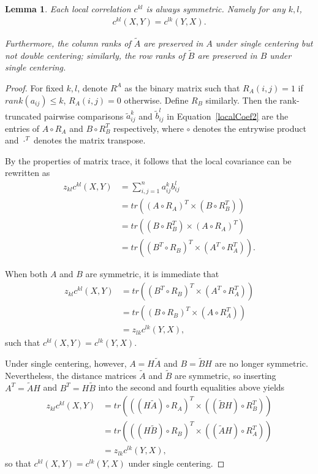 \documentclass[11pt]{article}
\providecommand{\mt}[1]{\widetilde{#1}}
\newcommand{\G}{c}
\newtheorem{appLem}{Lemma}
\begin{document}
\begin{appLem}
Each local correlation $\G^{kl}$ is always symmetric. Namely for any $k,l$, 
\begin{align*}
\G^{kl}(X,Y)=\G^{lk}(Y,X).
\end{align*}

Furthermore, the column ranks of $\tilde{A}$ are preserved in $A$ under single centering but not double centering; similarly, the row ranks of $\tilde{B}$ are preserved in $B$ under single centering.
\end{appLem}
\begin{proof}
For fixed $k,l$, denote $R^{A}$ as the binary matrix such that $R_{A}(i,j)=1$ if $rank(a_{ij}) \leq k$, $R_{A}(i,j)=0$ otherwise. Define $R_{B}$ similarly. Then the rank-truncated pairwise comparisons $\mt{a}_{ij}^k$ and $\mt{b}_{ij}^l$ in Equation~\ref{localCoef2} are the entries of $A \circ R_{A}$ and $B \circ R_{B}^{T}$ respectively, where $\circ$ denotes the entrywise product and $\cdot^{T}$ denotes the matrix transpose.

By the properties of matrix trace, it follows that the local covariance can be rewritten as
\begin{align*}
z_{kl} \G^{kl}(X,Y) &= \textstyle \sum_{i,j=1}^n a_{ij}^k b_{ij}^l \\
 &= tr((A \circ R_{A})^{T} \times (B \circ R_{B}^{T})) \\
 &= tr((B \circ R_{B}^{T}) \times (A \circ R_{A})^{T}) \\
 &= tr((B^{T} \circ R_{B})^{T} \times (A^{T} \circ R_{A}^{T})).
\end{align*}

When both $A$ and $B$ are symmetric, it is immediate that
\begin{align*}
z_{kl} \G^{kl}(X,Y) &= tr((B^{T} \circ R_{B})^{T} \times (A^{T} \circ R_{A}^{T})) \\
 &= tr((B \circ R_{B})^{T} \times (A \circ R_{A}^{T})) \\
 &= z_{lk} \G^{lk}(Y,X),
\end{align*}
such that $\G^{kl}(X,Y)=\G^{lk}(Y,X)$.

Under single centering, however, $A=H \tilde{A}$ and $B=\tilde{B}H$ are no longer symmetric. Nevertheless, the distance matrices $\tilde{A}$ and $\tilde{B}$ are symmetric, so inserting $A^{T}=\tilde{A}H$ and $B^{T}=H\tilde{B}$ into the second and fourth equalities above yields
\begin{align*}
z_{kl} \G^{kl}(X,Y) &= tr(((H \tilde{A}) \circ R_{A})^{T} \times ((\tilde{B}H) \circ R_{B}^{T})) \\
 &= tr(((H \tilde{B}) \circ R_{B})^{T} \times ((\tilde{A}H) \circ R_{A}^{T})) \\
 &= z_{lk} \G^{lk}(Y,X),
\end{align*}
so that $\G^{kl}(X,Y)=\G^{lk}(Y,X)$ under single centering.


\end{proof}
\end{document}
